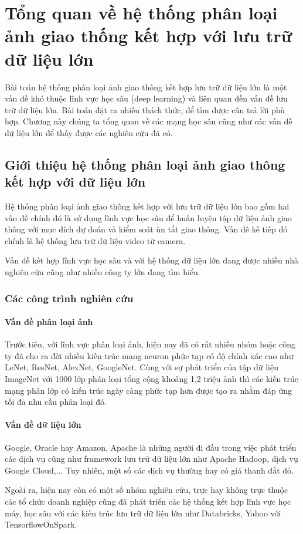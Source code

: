 \chapter{Tổng quan về hệ thống phân loại ảnh giao thống kết hợp với lưu trữ dữ liệu lớn}
Bài toán hệ thống phân loại ảnh giao thông kết hợp lưu trữ dữ liệu lớn là một vấn đề khó thuộc lĩnh vực học sâu (deep learning) và liên quan đền vấn đề lưu trữ dữ liệu lớn. Bài toán đặt ra nhiều thách thức, để tìm được câu trả lời phù hợp. Chương này chúng ta tổng quan về các mạng học sâu cũng như các vấn đề dữ liệu lớn để thấy được các nghiên cứu đã có.
\section{Giới thiệu hệ thống phân loại ảnh giao thông kết hợp với dữ liệu lớn}
Hệ thống phân loại ảnh giao thông kết hợp với lưu trữ dữ liệu lớn bao gồm hai vấn đề chính đó là sử dụng lĩnh vực học sâu để huấn luyện tập dữ liệu ảnh giao thông với mục đích dự đoán và kiểm soát ùn tắt giao thông. Vấn đê kế tiếp đó chính là hệ thống lưu trữ dữ liệu video từ camera.\par 
Vấn đề kết hợp lĩnh vực học sâu và với hệ thống dữ liệu lớn đang được nhiều nhà nghiên cứu cũng như nhiều công ty lớn đang tìm hiểu.
\subsection{Các công trình nghiên cứu}
\subsubsection*{Vấn đề phân loại ảnh}
Trước tiên, với lĩnh vực phân loại ảnh, hiện nay đã có rất nhiều nhóm hoặc công ty đã cho ra đời nhiều kiến trúc mạng neuron phức tạp có độ chính xác cao như LeNet, ResNet, AlexNet, GoogleNet. Cùng với sự phát triển của tập dữ liệu ImageNet với 1000 lớp phân loại tổng cộng khoảng 1,2 triệu ảnh thì các kiến trúc mạng phân lớp có kiến trúc ngày càng phức tạp hơn được tạo ra nhằm đáp ứng tối đa nhu cầu phân loại đó.\par

\subsubsection*{Vấn đề dữ liệu lớn}
Google, Oracle hay Amazon, Apache là những người đi đầu trong việc phát triển các dịch vụ cũng như framework lưu trữ dữ liệu lớn như Apache Hadoop, dịch vụ Google Cloud,... Tuy nhiên, một số các dịch vụ thường hay có giá thanh đắt đỏ.\par 
Ngoài ra, hiện nay còn có một số nhóm nghiên cứu, trực hay không trực thuộc các tổ chức doanh nghiệp cũng đã phát triển các hệ thống kết hợp lĩnh vực học máy, học sâu với các kiến trúc lưu trữ dữ liệu lớn như Databricks, Yahoo với TensorflowOnSpark.\par 

